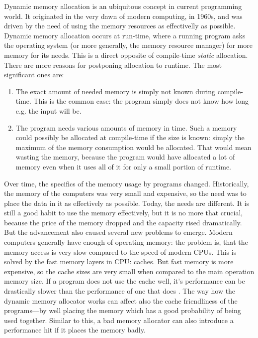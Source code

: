 Dynamic memory allocation is an ubiquitous concept in current programming world.
It originated in the very dawn of modern computing, in 1960s, and was driven by
the need of using the memory resources as effectivelly as possible. Dynamic
memory allocation occurs at run-time, where a running program asks the operating
system (or more generally, the memory resource manager) for more memory for its
needs. This is a direct opposite of compile-time {\em static} allocation. There
are more reasons for postponing allocation to runtime. The most significant ones
are:
\begin{enumerate}
\item The exact amount of needed memory is simply not known during compile-time.
This is the common case: the program simply does not know how long e.g. the input
will be.
\item The program needs various amounts of memory in time. Such a memory could
possibly be allocated at compile-time if the size is known: simply the maximum of
the memory consumption would be allocated. That would mean wasting the memory,
because the program would have allocated a lot of memory even when it uses all of
it for only a small portion of runtime.
\end{enumerate}

Over time, the specifics of the memory usage by programs changed. Historically,
the memory of the computers was very small and expensive, so the need was to
place the data in it as effectively as possible. Today, the needs are different.
It is still a good habit to use the memory effectively, but it is no more that
crucial, because the price of the memory dropped and the capacity rised
dramatically. But the advancement also caused several new problems to emerge.
Modern computers generally have enough of operating memory: the problem is, that
the memory access is very slow compared to the speed of modern CPUs. This is
solved by the fast memory layers in CPU: caches. But fast memory is more
expensive, so the cache sizes are very small when compared to the main operation
memory size. If a program does not use the cache well, it's performance can be
drastically slower than the performance of one that does \cite{drepper-memory}.
The way how the dynamic memory allocator works can affect also the cache
friendliness of the programs---by well placing the memory which has a good
probability of being used together. Similar to this, a bad memory allocator can
also introduce a performance hit if it places the memory badly.

